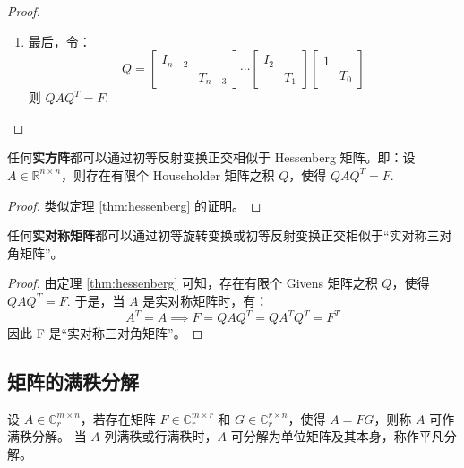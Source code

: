 \begin{proof}
\begin{enumerate}
    \item 最后，令：
    \[
        Q=\begin{bmatrix}I_{n-2}&\\&T_{n-3}\end{bmatrix}\cdots\begin{bmatrix}I_{2}&\\&T_{1}\end{bmatrix}\begin{bmatrix}1&\\&T_{0}\end{bmatrix}
    \]
    则 $QAQ^T=F$.
\end{enumerate}
\end{proof}

\begin{theorem}
任何\textbf{实方阵}都可以通过初等反射变换正交相似于 Hessenberg 矩阵。即：设 $A\in\mathbb R^{n\times n}$，则存在有限个 Householder 矩阵之积 $Q$，使得 $QAQ^T=F$.
\end{theorem}
\begin{proof}
类似定理 \ref{thm:hessenberg} 的证明。
\end{proof}

\begin{corollary}
任何\textbf{实对称矩阵}都可以通过初等旋转变换或初等反射变换正交相似于“实对称三对角矩阵”。
\end{corollary}
\begin{proof}
由定理 \ref{thm:hessenberg} 可知，存在有限个 Givens 矩阵之积 $Q$，使得 $QAQ^T=F$. 于是，当 $A$ 是实对称矩阵时，有：
\[A^T=A\implies F=QAQ^T=QA^TQ^T=F^T\]
因此 F 是“实对称三对角矩阵”。
\end{proof}


\subsection{矩阵的满秩分解}

\begin{definition}[满秩分解]
设 $A\in\mathbb C^{m\times n}_r$，若存在矩阵 $F\in\mathbb C^{m\times r}_r$ 和 $G\in\mathbb C^{r\times n}_r$，使得 $A=FG$，则称 $A$ 可作满秩分解。
当 $A$ 列满秩或行满秩时，$A$ 可分解为单位矩阵及其本身，称作平凡分解。
\end{definition}

